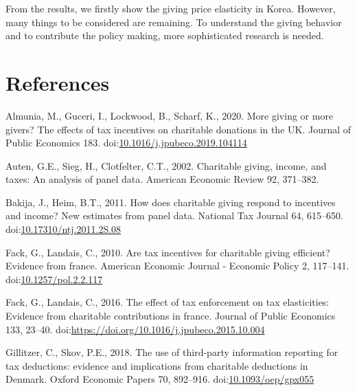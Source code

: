 \documentclass[
  11pt,
  a4paper,
]{article}
\newlength{\cslhangindent}
\newlength{\cslentryspacingunit} %
\newenvironment{CSLReferences}[2] %
 {%
  \setlength{\parindent}{0pt}
  \ifodd #1
  \let\oldpar\par
  \def\par{\hangindent=\cslhangindent\oldpar}
  \fi
  \setlength{\parskip}{#2\cslentryspacingunit}
 }%
 {}
\begin{document}
From the results, we firstly show the giving price elasticity in Korea. However, many things to be considered are remaining. To understand the giving behavior and to contribute the policy making, more sophisticated research is needed.

\clearpage

\hypertarget{references}{%
\section*{References}\label{references}}

\hypertarget{refs}{}
\begin{CSLReferences}{1}{0}
\leavevmode\hypertarget{ref-Almunia2020}{}%
Almunia, M., Guceri, I., Lockwood, B., Scharf, K., 2020. More giving or more givers? The effects of tax incentives on charitable donations in the UK. Journal of Public Economics 183. doi:\href{https://doi.org/10.1016/j.jpubeco.2019.104114}{10.1016/j.jpubeco.2019.104114}

\leavevmode\hypertarget{ref-Auten2002}{}%
Auten, G.E., Sieg, H., Clotfelter, C.T., 2002. Charitable giving, income, and taxes: An analysis of panel data. American Economic Review 92, 371--382.

\leavevmode\hypertarget{ref-Bakija2011}{}%
Bakija, J., Heim, B.T., 2011. How does charitable giving respond to incentives and income? New estimates from panel data. National Tax Journal 64, 615--650. doi:\href{https://doi.org/10.17310/ntj.2011.2S.08}{10.17310/ntj.2011.2S.08}

\leavevmode\hypertarget{ref-Fack2010}{}%
Fack, G., Landais, C., 2010. Are tax incentives for charitable giving efficient? Evidence from france. American Economic Journal - Economic Policy 2, 117--141. doi:\href{https://doi.org/10.1257/pol.2.2.117}{10.1257/pol.2.2.117}

\leavevmode\hypertarget{ref-Fack2016}{}%
Fack, G., Landais, C., 2016. The effect of tax enforcement on tax elasticities: Evidence from charitable contributions in france. Journal of Public Economics 133, 23--40. doi:\url{https://doi.org/10.1016/j.jpubeco.2015.10.004}

\leavevmode\hypertarget{ref-Gillitzer2018}{}%
Gillitzer, C., Skov, P.E., 2018. {The use of third-party information reporting for tax deductions: evidence and implications from charitable deductions in Denmark}. Oxford Economic Papers 70, 892--916. doi:\href{https://doi.org/10.1093/oep/gpx055}{10.1093/oep/gpx055}


\end{CSLReferences}
\end{document}

